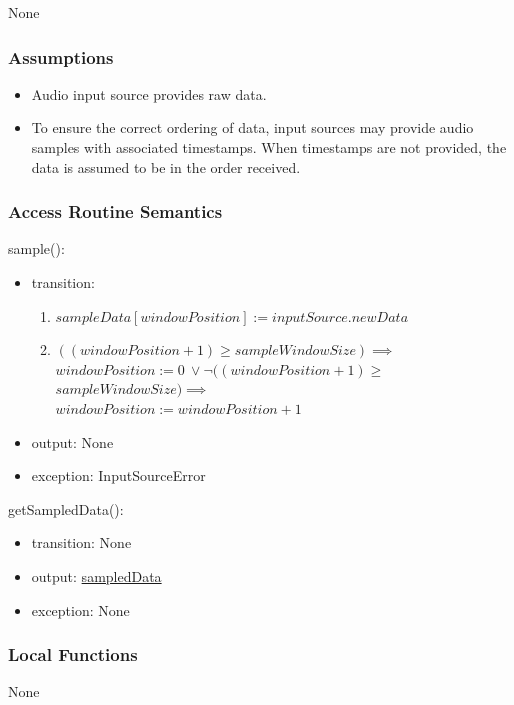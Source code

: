 \documentclass[12pt, titlepage]{article}
\begin{document}
None

\subsubsection{Assumptions}

\begin{itemize}
  \item Audio input source provides raw data.
  \item To ensure the correct ordering of data, input sources may provide
    audio samples with associated timestamps. When timestamps are not provided, 
    the data is assumed to be in the order received.
\end{itemize}


\subsubsection{Access Routine Semantics}

\noindent sample():
\begin{itemize}
\item transition: 
  \begin{enumerate}
    \item $sampleData[windowPosition] := inputSource.newData$
    \item $((windowPosition + 1) \geq sampleWindowSize) \implies $
      $windowPosition:= 0~\vee \neg ((windowPosition + 1) \geq $
      $sampleWindowSize) \implies$ \\ $ windowPosition:= windowPosition + 1$
  \end{enumerate}

\item output: None
\item exception: InputSourceError
\end{itemize}

\noindent getSampledData():
\begin{itemize}
\item transition: None 
\item output: \hyperref[var:sampleData]{sampledData}
\item exception: None
\end{itemize}

\subsubsection{Local Functions}

None

\newpage
\end{document}
